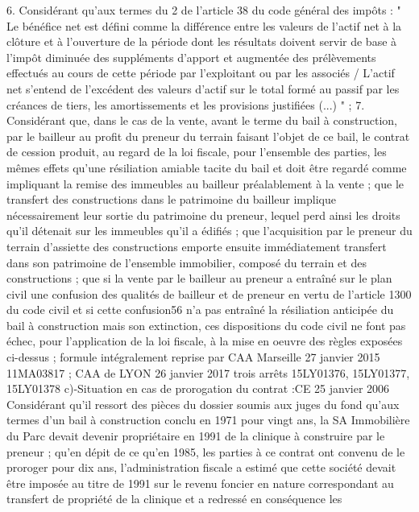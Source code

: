 \documentclass[11pt,a4paper]{report}
\begin{document}
	6. Considérant qu'aux termes du 2 de l'article 38 du code général des impôts : " Le bénéfice net est défini comme
	la différence entre les valeurs de l'actif net à la clôture et à l'ouverture de la période dont les résultats doivent
	servir de base à l'impôt diminuée des suppléments d'apport et augmentée des prélèvements effectués au cours de
	cette période par l'exploitant ou par les associés / L'actif net s'entend de l'excédent des valeurs d'actif sur le total
	formé au passif par les créances de tiers, les amortissements et les provisions justifiées (...) " ;
	7. Considérant que, dans le cas de la vente, avant le terme du bail à construction, par le bailleur au profit du
	preneur du terrain faisant l'objet de ce bail, le contrat de cession produit, au regard de la loi fiscale, pour
	l'ensemble des parties, les mêmes effets qu'une résiliation amiable tacite du bail et doit être regardé comme
	impliquant la remise des immeubles au bailleur préalablement à la vente ; que le transfert des constructions
	dans le patrimoine du bailleur implique nécessairement leur sortie du patrimoine du preneur, lequel perd ainsi
	les droits qu'il détenait sur les immeubles qu'il a édifiés ; que l'acquisition par le preneur du terrain d'assiette
	des constructions emporte ensuite immédiatement transfert dans son patrimoine de l'ensemble immobilier,
	composé du terrain et des constructions ; que si la vente par le bailleur au preneur a entraîné sur le plan civil
	une confusion des qualités de bailleur et de preneur en vertu de l'article 1300 du code civil et si cette confusion56
	n'a pas entraîné la résiliation anticipée du bail à construction mais son extinction, ces dispositions du code civil
	ne font pas échec, pour l'application de la loi fiscale, à la mise en oeuvre des règles exposées ci-dessus ;
	formule intégralement reprise par CAA Marseille 27 janvier 2015 \No  11MA03817 ; CAA de LYON 26 janvier
	2017 trois arrêts \No  15LY01376, \No  15LY01377, \No  15LY01378
	c)-Situation en cas de prorogation du contrat :CE 25 janvier 2006 
	Considérant qu'il ressort des pièces du dossier soumis aux juges du fond qu'aux termes d'un bail à construction
	conclu en 1971 pour vingt ans, la SA Immobilière du Parc devait devenir propriétaire en 1991 de la clinique à
	construire par le preneur ; qu'en dépit de ce qu'en 1985, les parties à ce contrat ont convenu de le proroger pour
	dix ans, l'administration fiscale a estimé que cette société devait être imposée au titre de 1991 sur le revenu
	foncier en nature correspondant au transfert de propriété de la clinique et a redressé en conséquence les
\end{document}
